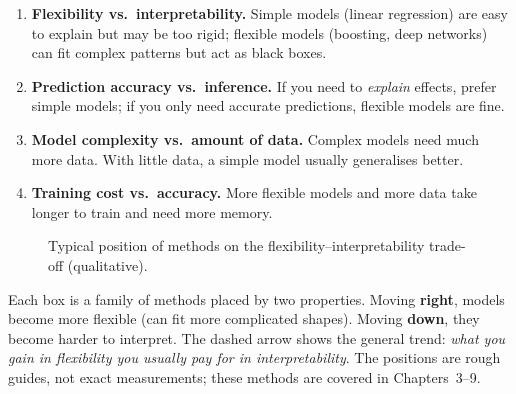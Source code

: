\begin{enumerate}
  \item \textbf{Flexibility vs.\ interpretability.} Simple models (linear regression) are easy to explain but may be too rigid; flexible models (boosting, deep networks) can fit complex patterns but act as black boxes.
  \item \textbf{Prediction accuracy vs.\ inference.} If you need to \emph{explain} effects, prefer simple models; if you only need accurate predictions, flexible models are fine.
  \item \textbf{Model complexity vs.\ amount of data.} Complex models need much more data. With little data, a simple model usually generalises better.
  \item \textbf{Training cost vs.\ accuracy.} More flexible models and more data take longer to train and need more memory.
\end{enumerate}

\begin{figure}[!htbp]
\centering
{}
\caption{Typical position of methods on the flexibility--interpretability trade-off (qualitative).}\label{fig:flexinterp}
\end{figure}

\begin{explain}
Each box is a family of methods placed by two properties. Moving \textbf{right}, models become more flexible (can fit more complicated shapes). Moving \textbf{down}, they become harder to interpret. The dashed arrow shows the general trend: \emph{what you gain in flexibility you usually pay for in interpretability}. The positions are rough guides, not exact measurements; these methods are covered in Chapters~3--9.
\end{explain}

